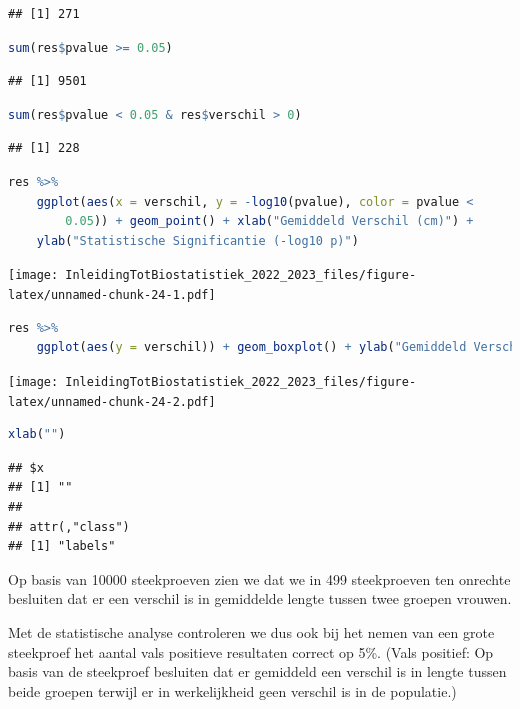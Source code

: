 \documentclass[
  12pt,dutch,coursenotes]{book}
\begin{document}
\begin{lstlisting}
## [1] 271
\end{lstlisting}

\begin{lstlisting}[language=R]
sum(res$pvalue >= 0.05)
\end{lstlisting}

\begin{lstlisting}
## [1] 9501
\end{lstlisting}

\begin{lstlisting}[language=R]
sum(res$pvalue < 0.05 & res$verschil > 0)
\end{lstlisting}

\begin{lstlisting}
## [1] 228
\end{lstlisting}

\begin{lstlisting}[language=R]
res %>%
    ggplot(aes(x = verschil, y = -log10(pvalue), color = pvalue <
        0.05)) + geom_point() + xlab("Gemiddeld Verschil (cm)") +
    ylab("Statistische Significantie (-log10 p)")
\end{lstlisting}

\texttt{[image: InleidingTotBiostatistiek\_2022\_2023\_files/figure-latex/unnamed-chunk-24-1.pdf]}

\begin{lstlisting}[language=R]
res %>%
    ggplot(aes(y = verschil)) + geom_boxplot() + ylab("Gemiddeld Verschil (cm)")
\end{lstlisting}

\texttt{[image: InleidingTotBiostatistiek\_2022\_2023\_files/figure-latex/unnamed-chunk-24-2.pdf]}

\begin{lstlisting}[language=R]
xlab("")
\end{lstlisting}

\begin{lstlisting}
## $x
## [1] ""
## 
## attr(,"class")
## [1] "labels"
\end{lstlisting}

Op basis van 10000 steekproeven zien we dat we in 499 steekproeven ten onrechte besluiten dat er een verschil is in gemiddelde lengte tussen twee groepen vrouwen.

Met de statistische analyse controleren we dus ook bij het nemen van een grote steekproef het aantal vals positieve resultaten correct op 5\%. (Vals positief: Op basis van de steekproef besluiten dat er gemiddeld een verschil is in lengte tussen beide groepen terwijl er in werkelijkheid geen verschil is in de populatie.)
\end{document}
